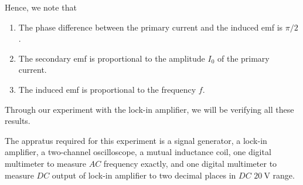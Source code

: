 \documentclass[%
 reprint,
nofootinbib,
 amsmath,amssymb,
 aps,
]{revtex4-2}
\begin{document}
        Hence, we note that
        \begin{enumerate}
            \item The phase difference between the primary current and the induced emf is $\pi/2$.
            \item The secondary emf is proportional to the amplitude $I_0$ of the primary current.
            \item The induced emf is proportional to the frequency $f$.
        \end{enumerate}
        Through our experiment with the lock-in amplifier, we will be verifying all these results.
        \par
        The appratus required for this experiment is a signal generator, a lock-in amplifier, a two-channel oscilloscope, a mutual inductance coil, one digital multimeter to measure $AC$ frequency exactly, and one digital multimeter to measure $DC$ output of lock-in amplifier to two decimal places in $DC$ $\SI{20}{\volt}$ range. 
\end{document}
